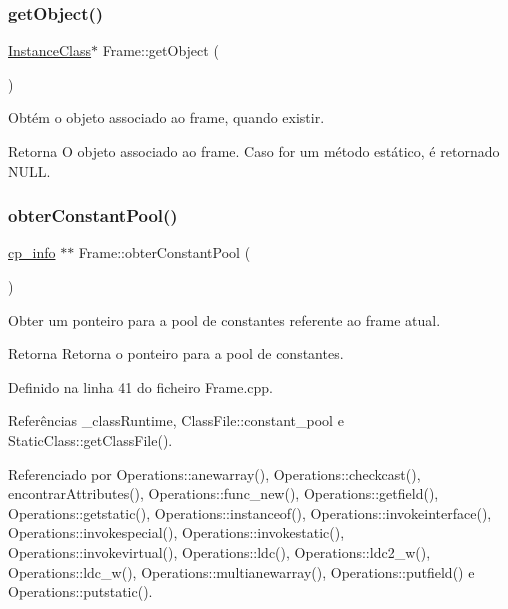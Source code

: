 \mbox{\label{classFrame_a4a45cafe1eee6c6b2ae6a04e284163f9}} 
\subsubsection{\texorpdfstring{get\+Object()}{getObject()}}
{\footnotesize\ttfamily \hyperlink{classInstanceClass}{Instance\+Class}$\ast$ Frame\+::get\+Object (\begin{DoxyParamCaption}{ }\end{DoxyParamCaption})}



Obtém o objeto associado ao frame, quando existir. 

\begin{DoxyReturn}{Retorna}
O objeto associado ao frame. Caso for um método estático, é retornado {\ttfamily N\+U\+LL}. 
\end{DoxyReturn}
\mbox{\label{classFrame_a77f9705e64bfbdfc68921b7de11a893f}} 
\subsubsection{\texorpdfstring{obter\+Constant\+Pool()}{obterConstantPool()}}
{\footnotesize\ttfamily \hyperlink{structcp__info}{cp\+\_\+info} $\ast$$\ast$ Frame\+::obter\+Constant\+Pool (\begin{DoxyParamCaption}{ }\end{DoxyParamCaption})}



Obter um ponteiro para a pool de constantes referente ao frame atual. 

\begin{DoxyReturn}{Retorna}
Retorna o ponteiro para a pool de constantes. 
\end{DoxyReturn}


Definido na linha 41 do ficheiro Frame.\+cpp.



Referências \+\_\+class\+Runtime, Class\+File\+::constant\+\_\+pool e Static\+Class\+::get\+Class\+File().



Referenciado por Operations\+::anewarray(), Operations\+::checkcast(), encontrar\+Attributes(), Operations\+::func\+\_\+new(), Operations\+::getfield(), Operations\+::getstatic(), Operations\+::instanceof(), Operations\+::invokeinterface(), Operations\+::invokespecial(), Operations\+::invokestatic(), Operations\+::invokevirtual(), Operations\+::ldc(), Operations\+::ldc2\+\_\+w(), Operations\+::ldc\+\_\+w(), Operations\+::multianewarray(), Operations\+::putfield() e Operations\+::putstatic().


